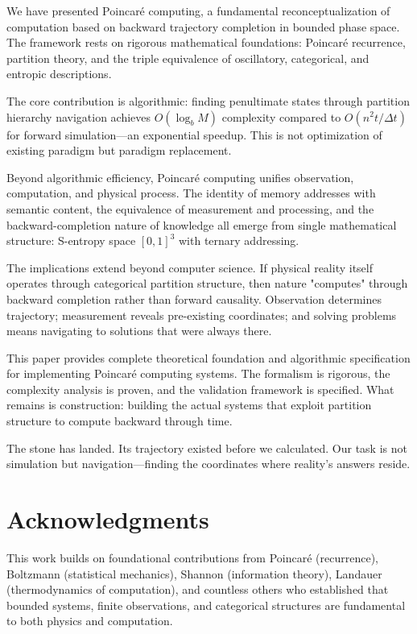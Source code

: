 \documentclass[twocolumn,10pt]{article}
\begin{document}
We have presented Poincaré computing, a fundamental reconceptualization of computation based on backward trajectory completion in bounded phase space. The framework rests on rigorous mathematical foundations: Poincaré recurrence, partition theory, and the triple equivalence of oscillatory, categorical, and entropic descriptions.

The core contribution is algorithmic: finding penultimate states through partition hierarchy navigation achieves $O(\log_b M)$ complexity compared to $O(n^2 t/\Delta t)$ for forward simulation—an exponential speedup. This is not optimization of existing paradigm but paradigm replacement.

Beyond algorithmic efficiency, Poincaré computing unifies observation, computation, and physical process. The identity of memory addresses with semantic content, the equivalence of measurement and processing, and the backward-completion nature of knowledge all emerge from single mathematical structure: S-entropy space $[0,1]^3$ with ternary addressing.

The implications extend beyond computer science. If physical reality itself operates through categorical partition structure, then nature "computes" through backward completion rather than forward causality. Observation determines trajectory; measurement reveals pre-existing coordinates; and solving problems means navigating to solutions that were always there.

This paper provides complete theoretical foundation and algorithmic specification for implementing Poincaré computing systems. The formalism is rigorous, the complexity analysis is proven, and the validation framework is specified. What remains is construction: building the actual systems that exploit partition structure to compute backward through time.

The stone has landed. Its trajectory existed before we calculated. Our task is not simulation but navigation—finding the coordinates where reality's answers reside.

\section*{Acknowledgments}

This work builds on foundational contributions from Poincaré (recurrence), Boltzmann (statistical mechanics), Shannon (information theory), Landauer (thermodynamics of computation), and countless others who established that bounded systems, finite observations, and categorical structures are fundamental to both physics and computation.



\end{document}
